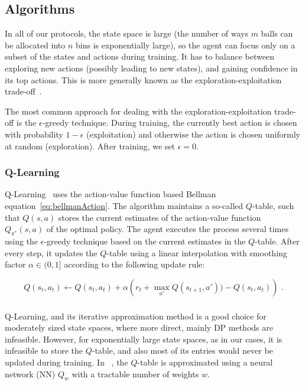 \subsection{Algorithms}


In all of our protocols, the state space is large (the number of ways $m$ balls can be allocated into $n$ bins is exponentially large), so the agent can focus only on a subset of the states and actions during training. It has to balance between exploring new actions (possibly leading to new states), and gaining confidence in its top actions. This is more generally known as the exploration-exploitation trade-off~\cite{kaelbling1996explorationexploitation}.

The most common approach for dealing with the exploration-exploitation trade-off is the $\epsilon$-greedy technique. During training, the currently best action is chosen with probability $1-\epsilon$ (exploitation) and otherwise the action is chosen uniformly at random (exploration). After training, we set $\epsilon=0$.



\subsubsection*{Q-Learning}


Q-Learning~\cite{watkins1989qlearning} uses the action-value function based Bellman equation~\eqref{eq:bellmanAction}. The algorithm maintains a so-called $Q$-table, such that $Q(s,a)$ stores the current estimates of the action-value function $Q_{\pi^*}(s,a)$ of the optimal policy. The agent executes the process several times using the $\epsilon$-greedy technique based on the current estimates in the $Q$-table. After every step, it updates the $Q$-table using a linear interpolation with smoothing factor $\alpha \in (0,1]$ according to the following update rule:

\begin{equation} \label{eq:q-learningUpdate}
Q(s_t,a_t) \leftarrow Q(s_t,a_t) + \alpha\left( r_t + \max_{a'} Q(s_{t+1}, a')) - Q(s_t,a_t)\right) \text{ .}
\end{equation}


\subsubsection*{\DQL} \label{deepq-learning}


Q-Learning, and its iterative approximation method is a good choice for moderately sized state spaces, where more direct, mainly DP methods are infeasible. However, for exponentially large state spaces, as in our cases, it is infeasible to store the $Q$-table, and also most of its entries would never be updated during training. In \DQL~\cite{mnih2013DQN}, the $Q$-table is approximated using a neural network (NN) $Q_w$ with a tractable number of weights $w$.

